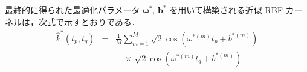 \documentclass[conference]{IEEEtran}
\begin{document}
最終的に得られた最適化パラメータ $\boldsymbol{\omega}^{\ast},\,\boldsymbol{b}^{\ast}$ を用いて構築される近似 RBF カーネルは，次式で示すとおりである．
\begin{eqnarray}
  \hat{k}^{\ast}(t_p,t_q)
    &=& \frac{1}{M}\sum_{m=1}^M \sqrt{2}\cos(\omega^{\ast(m)}t_p + b^{\ast(m)}) \nonumber\\
    &&\quad \times\,\sqrt{2}\cos(\omega^{\ast(m)}t_q + b^{\ast(m)})
  \label{eq:rff_kernel_opt}
\end{eqnarray}

\end{document}
